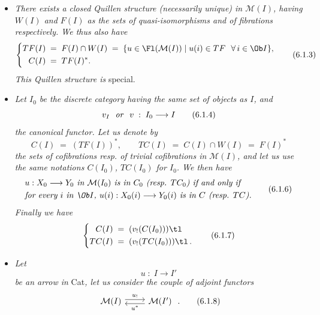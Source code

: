 \begin{itemize}[leftmargin=2.5em]
\item[a)] \textit{There exists a closed Quillen structure (necessarily unique) in $\mathcal{M}(I)$, having $W(I)$ and $F(I)$ as the sets of quasi-isomorphisms and of fibrations respectively. We thus also have}
\[
\left\{
\begin{aligned}
TF(I) \;&=\; F(I)\cap W(I) \;=\; \{u\in \Fl(\mathcal{M}(I)) \mid u(i)\in TF \ \ \forall\, i\in \Ob I\},\\
C(I) \;&=\; TF(I)^{*}.
\end{aligned}
\right.
\tag*{(6.1.3)}
\]
\textit{This Quillen structure is} special.

\item[b)] \textit{Let $I_0$ be the discrete category having the same set of objects as $I$, and}
\[
v_I \ \ \text{\textit{or}}\ \ v \;:\; I_0 \longrightarrow I
\tag*{(6.1.4)}
\]
\textit{the canonical functor. Let us denote by}
\[
C(I) \;=\; (TF(I))^{*}, \qquad TC(I) \;=\; C(I)\cap W(I) \;=\; F(I)^{*}
\tag*{(6.1.5)}
\]
\textit{the sets of cofibrations resp. of trivial cofibrations in $\mathcal{M}(I)$, and let us use the same notations $C(I_0)$, $TC(I_0)$ for $I_0$. We then have}
\[
\begin{aligned}
&\text{\textit{$u : X_0 \longrightarrow Y_0$ in $\mathcal{M}(I_0)$ is in $C_0$ (resp. $TC_0$) if and only if}}\\
&\text{\textit{for every $i$ in $\Ob I$, $u(i) : X_0(i) \longrightarrow Y_0(i)$ is in $C$ (resp. $TC$).}}
\end{aligned}
\tag*{(6.1.6)}
\]
\textit{Finally we have}
\[
\left\{
\begin{aligned}
C(I) \;&=\; (v_!(C(I_0)))\tl\\
TC(I) \;&=\; (v_!(TC(I_0)))\tl\,.
\end{aligned}
\right.
\tag*{(6.1.7)} %
\]

\item[c)] \textit{Let}
\[
u \;:\; I \longrightarrow I'
\]
\textit{be an arrow in} Cat\textit{, let us consider the couple of adjoint functors}
\[
\begin{tikzcd}
\mathcal{M}(I) \arrow[r, shift left, "u_!"] & \mathcal{M}(I') \arrow[l, shift left, "u^{*}"]
\end{tikzcd}
\;.
\tag*{(6.1.8)}
\]



\end{itemize}
